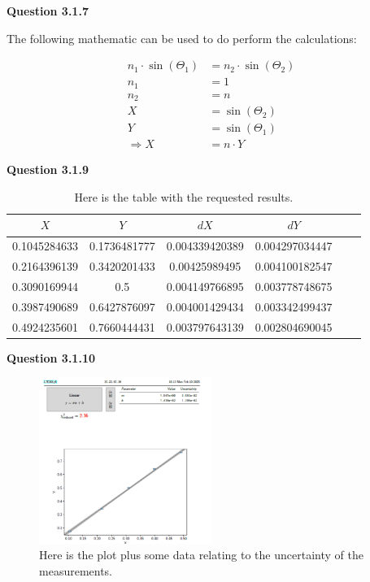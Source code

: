 \documentclass[a4paper,12pt]{article}
\begin{document}
\vspace{1cm}

\noindent \textbf{\LARGE Question 3.1.7}

\vspace{0.3cm}

The following mathematic can be used to do perform the calculations:

\begin{align*}
    n_1 \cdot \sin(\Theta_1) &= n_2 \cdot \sin(\Theta_2) \\
    n_1 &= 1 \\
    n_2 &= n \\
    X &= \sin(\Theta_2) \\
    Y &= \sin(\Theta_1) \\
    \Rightarrow X &= n \cdot Y
    \end{align*}

\vspace{1cm}

\noindent \textbf{\LARGE Question 3.1.9}

\begin{table}[h]
    \centering
    \begin{tabular}{cccccc}
        \toprule
        $X$ & $Y$ & $dX$ & $dY$ \\
        \midrule
        0.1045284633 & 0.1736481777 & 0.004339420389 & 0.004297034447 \\
        0.2164396139 & 0.3420201433 & 0.00425989495 & 0.004100182547 \\
        0.3090169944 & 0.5 & 0.004149766895 & 0.003778748675 \\
        0.3987490689 & 0.6427876097 & 0.004001429434 & 0.003342499437 \\
        0.4924235601 & 0.7660444431 & 0.003797643139 & 0.002804690045 \\
        \bottomrule
    \end{tabular}
    \caption{Here is the table with the requested results.}
    \label{tab:my_label}
\end{table}

\vspace{5cm}

\noindent \textbf{\LARGE Question 3.1.10}

\begin{figure}[htbp]
    \centering
    \includegraphics[width=0.5\textwidth]{third_diagram_lab1_PHY_192.png}
    \caption{Here is the plot plus some data relating to the uncertainty of the measurements.} 
\end{figure}
\end{document}
